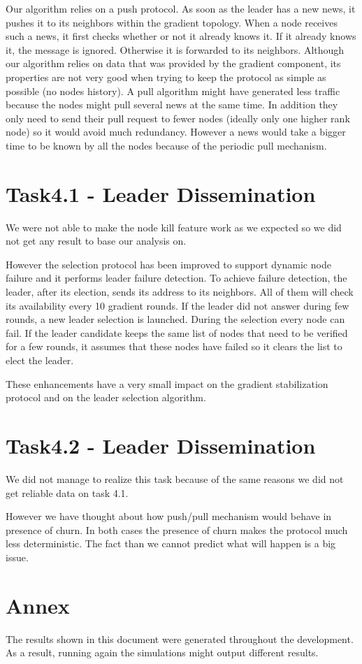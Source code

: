 \documentclass[conference]{IEEEtran}
\begin{document}
Our algorithm relies on a push protocol. As soon as the leader has a new news, it pushes it to its neighbors within the gradient topology. When a node receives such a news, it first checks whether or not it already knows it. If it already knows it, the message is ignored. Otherwise it is forwarded to its neighbors.
Although our algorithm relies on data that was provided by the gradient component, its properties are not very good when trying to keep the protocol as simple as possible (no nodes history).
A pull algorithm might have generated less traffic because the nodes might pull several news at the same time. In addition they only need to send their pull request to fewer nodes (ideally only one higher rank node) so it would avoid much redundancy. However a news would take a bigger time to be known by all the nodes because of the periodic pull mechanism.

\section{Task4.1 - Leader Dissemination}
We were not able to make the node kill feature work as we expected so we did not get any result to base our analysis on.

However the selection protocol has been improved to support dynamic node failure and it performs leader failure detection. To achieve failure detection, the leader, after its election, sends its address to its neighbors. All of them will check its availability every 10 gradient rounds. If the leader did not answer during few rounds, a new leader selection is launched.
During the selection every node can fail.
If the leader candidate keeps the same list of nodes that need to be verified for a few rounds, it assumes that these nodes have failed so it clears the list to elect the leader.

These enhancements have a very small impact on the gradient stabilization protocol and on the leader selection algorithm.

\section{Task4.2 - Leader Dissemination}

We did not manage to realize this task because of the same reasons we did not get reliable data on task 4.1.

However we have thought about how push/pull mechanism would behave in presence of churn. In both cases the presence of churn makes the protocol much less deterministic. The fact than we cannot predict what will happen is a big issue.

\section{Annex}
The results shown in this document were generated throughout the development. As a result, running again the simulations might output different results.

\end{document}
